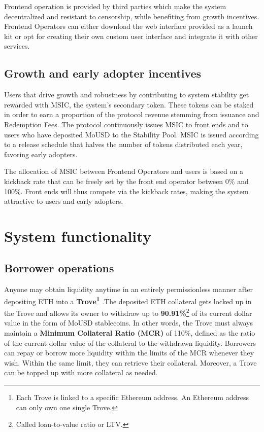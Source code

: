 \documentclass{article}
\begin{document}
Frontend operation is provided by third parties which make the system decentralized and resistant to censorship, while benefiting from growth incentives. Frontend Operators can either download the web interface provided as a launch kit or opt for creating their own custom user interface and integrate it with other services.

\subsection{Growth and early adopter incentives}
Users that drive growth and robustness by contributing to system stability get rewarded with MSIC, the system's secondary token. These tokens can be staked in order to earn a proportion of the protocol revenue stemming from issuance and Redemption Fees. The protocol continuously issues MSIC to front ends and to users who have deposited MoUSD to the Stability Pool. MSIC is issued according to a release schedule that halves the number of tokens distributed each year, favoring early adopters.

The allocation of MSIC between Frontend Operators and users is based on a kickback rate that can be freely set by the front end operator between 0\% and 100\%. Front ends will thus compete via the kickback rates, making the system attractive to users and early adopters.

\section{System functionality}
\subsection{Borrower operations }
Anyone may obtain liquidity anytime in an entirely permissionless manner after depositing ETH into a \textbf{Trove\footnote{Each Trove is linked to a specific Ethereum address. An Ethereum address can only own one single Trove.} }.The deposited ETH collateral gets locked up in the Trove and allows its owner to withdraw up to \textbf{90.91\%}\footnote{Called loan-to-value ratio or LTV.} of its current dollar value in the form of MoUSD stablecoins. In other words, the Trove must always maintain a \textbf{Minimum Collateral Ratio (MCR)} of 110\%, defined as the ratio of the current dollar value of the collateral to the withdrawn liquidity. Borrowers can repay or borrow more liquidity within the limits of the MCR whenever they wish. Within the same limit, they can retrieve their collateral. Moreover, a Trove can be topped up with more collateral as needed. 
\end{document}
